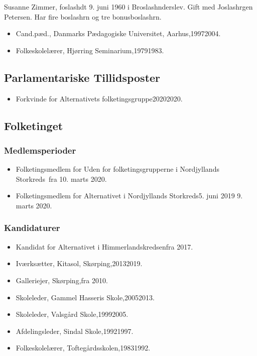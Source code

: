 \documentclass[11pt, a4paper]{awesome-cv}
\begin{document}
\makecvheader[R]
\makelettertitle
\begin{cvletter}
Susanne Zimmer, foslashdt 9. juni 1960 i Broslashnderslev. Gift med Joslashrgen Petersen. Har fire boslashrn og tre bonusboslashrn.

\begin{itemize}
\item Cand.pæd., Danmarks Pædagogiske Universitet, Aarhus,19972004.
\item Folkeskolelærer, Hjørring Seminarium,19791983.
\end{itemize}
\subsection*{Parlamentariske Tillidsposter}
\begin{itemize}
\item Forkvinde for Alternativets folketingsgruppe20202020.
\end{itemize}
\subsection*{Folketinget}
\subsubsection*{Medlemsperioder}
\begin{itemize}
\item Folketingsmedlem for Uden for folketingsgrupperne i Nordjyllands Storkreds fra 10. marts 2020.
\item Folketingsmedlem for Alternativet i Nordjyllands Storkreds5. juni 2019  9. marts 2020.
\end{itemize}
\subsubsection*{Kandidaturer}
\begin{itemize}
\item Kandidat for Alternativet i Himmerlandskredsenfra 2017.
\end{itemize}
\begin{itemize}
\item Iværksætter, Kitasol, Skørping,20132019.
\item Galleriejer, Skørping,fra 2010.
\item Skoleleder, Gammel Hasseris Skole,20052013.
\item Skoleleder, Valsgård Skole,19992005.
\item Afdelingsleder, Sindal Skole,19921997.
\item Folkeskolelærer, Toftegårdsskolen,19831992.
\end{itemize}
\end{cvletter}
\end{document}
